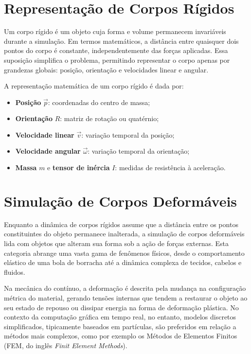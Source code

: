 \section{Representação de Corpos Rígidos}

Um corpo rígido é um objeto cuja forma e volume permanecem invariáveis durante a simulação. Em termos matemáticos, a distância entre quaisquer dois pontos do corpo é constante, independentemente das forças aplicadas. Essa suposição simplifica o problema, permitindo representar o corpo apenas por grandezas globais: posição, orientação e velocidades linear e angular.

A representação matemática de um corpo rígido é dada por:
\begin{itemize}
	\item \textbf{Posição} $\vec p$: coordenadas do centro de massa;
	\item \textbf{Orientação} $R$: matriz de rotação ou quatérnio;
	\item \textbf{Velocidade linear} $\vec v$: variação temporal da posição;
	\item \textbf{Velocidade angular} $\vec{\omega}$: variação temporal da orientação;
	\item \textbf{Massa} $m$ e \textbf{tensor de inércia} $I$: medidas de resistência à aceleração.
\end{itemize}

\section{Simulação de Corpos Deformáveis}

Enquanto a dinâmica de corpos rígidos assume que a distância entre os pontos constituintes do objeto permanece inalterada, a simulação de corpos deformáveis lida com objetos que alteram sua forma sob a ação de forças externas. Esta categoria abrange uma vasta gama de fenômenos físicos, desde o comportamento elástico de uma bola de borracha até a dinâmica complexa de tecidos, cabelos e fluidos.

Na mecânica do contínuo, a deformação é descrita pela mudança na configuração métrica do material, gerando tensões internas que tendem a restaurar o objeto ao seu estado de repouso ou dissipar energia na forma de deformação plástica. No contexto da computação gráfica em tempo real, no entanto, modelos discretos simplificados, tipicamente baseados em partículas, são preferidos em relação a métodos mais complexos, como por exemplo os Métodos de Elementos Finitos (FEM, do inglês \textit{Finit Element Methods}).

